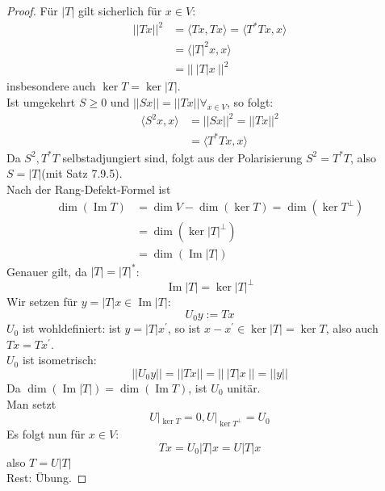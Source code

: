 \documentclass[12pt,a4paper]{article}
\theoremstyle{definition}
\theoremstyle{remark}
\DeclareMathOperator{\Img}{Im}
\begin{document}
	\begin{proof}
		Für $|T|$ gilt sicherlich für $x \in V$:
		\begin{equation}
			\begin{split}
				||Tx||^2&=  \langle Tx, Tx \rangle = \langle T^*Tx,x \rangle \\
				&= \langle |T|^2x,x \rangle \\
				&= || \ |T|x \ ||^2
			\end{split}
		\end{equation}
		insbesondere auch $\ker T = \ker |T|$. \\
		Ist umgekehrt $S \geq 0$ und $||Sx||=||Tx|| \forall_{x \in V}$, so folgt:
		\begin{equation}
			\begin{split}
				\langle S^2x,x \rangle &= ||Sx||^2 = ||Tx||^2 \\
				&= \langle T^*Tx,x \rangle
			\end{split}
		\end{equation}
		Da $S^2,T^*T$ selbstadjungiert sind, folgt aus der Polarisierung $S^2=T^*T$, also $S = |T|$(mit Satz 7.9.5). \\
		Nach der Rang-Defekt-Formel ist 
		\begin{equation}
			\begin{split}
				\dim (\Img T) &= \dim V-\dim (\ker T) = \dim (\ker T^{\bot}) \\
				&= \dim (\ker |T|^{\bot}) \\
				&= \dim(\Img |T|)
			\end{split}
		\end{equation}
		Genauer gilt, da $|T|=|T|^*$: 
		\begin{equation}
			\Img |T| = \ker |T|^{\bot}
		\end{equation}
		Wir setzen für $y = |T|x \in \Img |T|$:
		\begin{equation}
			U_0y:=Tx
		\end{equation}
		$U_0$ ist wohldefiniert: ist $y = |T|x^{'}$, so ist $x-x^{'} \in \ker |T|=\ker T$, also auch $Tx = Tx^{'}$. \\
		$U_0$ ist isometrisch:
		\begin{equation}
			||U_0y||=||Tx|| = || \ |T|x \ || = ||y||
		\end{equation}
		Da $\dim (\Img |T|)=\dim (\Img T)$, ist $U_0$ unitär. \\
		Man setzt
		\begin{equation}
			U|_{\ker T}=0, U|_{\ker T^{\bot}}=U_0
		\end{equation}
		Es folgt nun für $x \in V$:
		\begin{equation}
			Tx = U_0|T|x=U|T|x
		\end{equation}
		also $T = U|T|$ \\		
		Rest: Übung.
	\end{proof}
	\newpage
\end{document}
